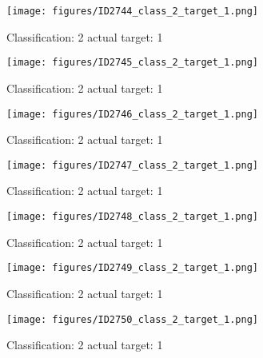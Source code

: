 \begin{figure}[h!]
\begin{center}
\texttt{[image: figures/ID2744\_class\_2\_target\_1.png]}
\end{center}
\caption{ Classification: 2 actual target: 1}
\label{fig:ID2744_class_2_target_1}
\end{figure}
\begin{figure}[h!]
\begin{center}
\texttt{[image: figures/ID2745\_class\_2\_target\_1.png]}
\end{center}
\caption{ Classification: 2 actual target: 1}
\label{fig:ID2745_class_2_target_1}
\end{figure}
\begin{figure}[h!]
\begin{center}
\texttt{[image: figures/ID2746\_class\_2\_target\_1.png]}
\end{center}
\caption{ Classification: 2 actual target: 1}
\label{fig:ID2746_class_2_target_1}
\end{figure}
\begin{figure}[h!]
\begin{center}
\texttt{[image: figures/ID2747\_class\_2\_target\_1.png]}
\end{center}
\caption{ Classification: 2 actual target: 1}
\label{fig:ID2747_class_2_target_1}
\end{figure}
\begin{figure}[h!]
\begin{center}
\texttt{[image: figures/ID2748\_class\_2\_target\_1.png]}
\end{center}
\caption{ Classification: 2 actual target: 1}
\label{fig:ID2748_class_2_target_1}
\end{figure}
\begin{figure}[h!]
\begin{center}
\texttt{[image: figures/ID2749\_class\_2\_target\_1.png]}
\end{center}
\caption{ Classification: 2 actual target: 1}
\label{fig:ID2749_class_2_target_1}
\end{figure}
\begin{figure}[h!]
\begin{center}
\texttt{[image: figures/ID2750\_class\_2\_target\_1.png]}
\end{center}
\caption{ Classification: 2 actual target: 1}
\label{fig:ID2750_class_2_target_1}
\end{figure}
